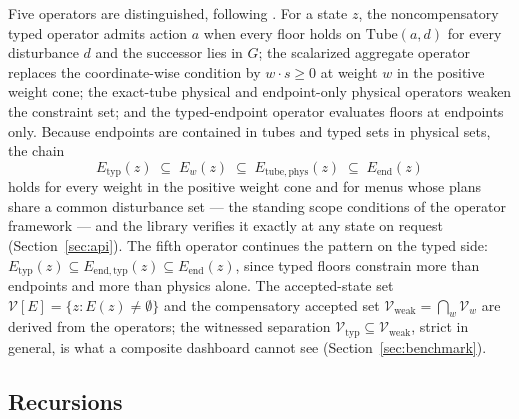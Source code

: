 \documentclass[3p,11pt]{elsarticle}
\begin{document}
Five operators are distinguished, following \citet{Abaee2026a}. For a state $z$,
the noncompensatory typed operator admits action $a$ when every floor holds
on $\mathrm{Tube}(a, d)$ for every disturbance $d$ and the successor lies in
$G$; the scalarized aggregate operator replaces the coordinate-wise
condition by $w \cdot s \geq 0$ at weight $w$ in the positive weight cone;
the exact-tube physical and endpoint-only physical operators weaken the
constraint set; and the typed-endpoint operator evaluates floors at
endpoints only. Because endpoints are contained in tubes and typed sets in
physical sets, the chain
\[
E_{\mathrm{typ}}(z) \;\subseteq\; E_w(z) \;\subseteq\;
E_{\mathrm{tube,phys}}(z) \;\subseteq\; E_{\mathrm{end}}(z)
\]
holds for every weight in the positive weight cone and for menus whose plans
share a common disturbance set --- the standing scope conditions of the
operator framework --- and the library verifies it exactly at any state on
request (Section~\ref{sec:api}). The fifth operator continues the
pattern on the typed side: $E_{\mathrm{typ}}(z) \subseteq
E_{\mathrm{end,typ}}(z) \subseteq E_{\mathrm{end}}(z)$, since typed floors
constrain more than endpoints and more than physics alone. The accepted-state set
$\mathcal{V}[E] = \{ z : E(z) \neq \emptyset \}$ and the compensatory
accepted set $\mathcal{V}_{\mathrm{weak}} = \bigcap_w \mathcal{V}_w$ are
derived from the operators; the witnessed separation
$\mathcal{V}_{\mathrm{typ}} \subseteq \mathcal{V}_{\mathrm{weak}}$, strict in
general, is what a composite dashboard cannot see (Section~\ref{sec:benchmark}).

\subsection{Recursions}\label{sec:recursions}
\end{document}
